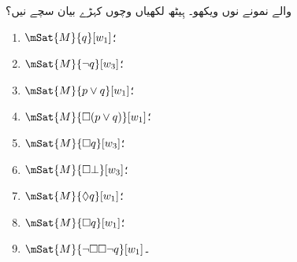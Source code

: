 \documentclass[../../../include/open-logic-section]{subfiles}
\begin{document}
\begin{prob}
   والے نمونے نوں ویکھو۔ ہِیٹھ لکھیاں وچوں کہڑے بیان سچے نیں؟
    \begin{enumerate}
    \item $\mSat{M}{q}[w_1]$؛
    \item $\mSat{M}{\lnot q}[w_3]$؛
    \item $\mSat{M}{p \lor q}[w_1]$؛
    \item $\mSat{M}{\Box (p \lor q)}[w_1]$؛
    \item $\mSat{M}{\Box q}[w_3]$؛
    \item $\mSat{M}{\Box \bot}[w_3]$؛
    \item $\mSat{M}{\Diamond q}[w_1]$؛
    \item $\mSat{M}{\Box q}[w_1]$؛
    \item $\mSat{M}{\lnot \Box\Box \lnot q}[w_1]$۔
    \end{enumerate}
\end{prob}
\end{document}
